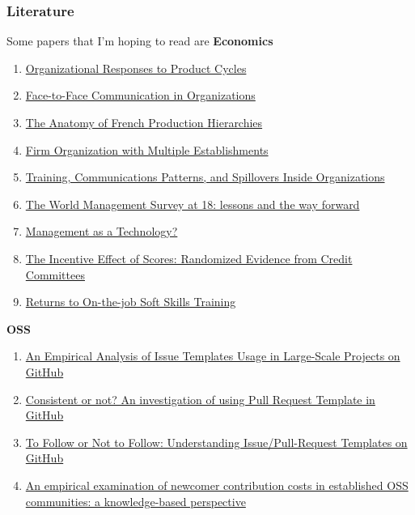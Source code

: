 \documentclass[source/paper/main.tex]{subfiles}
\begin{document}
\subsubsection{Literature} 
Some papers that I'm hoping to read are
\textbf{Economics}
\begin{enumerate}
    \item \hyperlink{https://www.hbs.edu/ris/Publication\%20Files/23-061_d9d37062-d3d7-4377-a959-81f75337916d.pdf}{Organizational Responses to Product Cycles}
    \item \hyperlink{https://academic.oup.com/restud/article-abstract/88/2/574/5922651?redirectedFrom=fulltext}{Face-to-Face Communication in Organizations}
    \item \hyperlink{https://spinup-000d1a-wp-offload-media.s3.amazonaws.com/faculty/wp-content/uploads/sites/40/2019/06/AFPH.pdf}{The Anatomy of French Production Hierarchies}
    \item \hyperlink{https://academic.oup.com/qje/article/137/2/1091/6481649}{Firm Organization with Multiple Establishments}
    \item \hyperlink{https://www.nber.org/papers/w30224}{Training, Communications Patterns, and Spillovers Inside Organizations}
    \item \hyperlink{https://academic.oup.com/oxrep/article-abstract/37/2/231/6311333?redirectedFrom=fulltext}{The World Management Survey at 18: lessons and the way forward}
    \item \hyperlink{https://worldmanagementsurvey.org/wp-content/uploads/2016/07/w22327.pdf}{Management as a Technology?}
    \item \hyperlink{https://drive.google.com/file/d/0B49txSZyKZcFV0lnYTZSa3l0Y1U/view?resourcekey=0-VT4ZQPV2aUJU-_PJ95pPKw}{The Incentive Effect of Scores: Randomized Evidence from Credit Committees}
    \item \hyperlink{https://www.dropbox.com/scl/fi/vvclf3nl45h9ngwimpmyd/PACE_dec2021.pdf?rlkey=pvsydc2bnd2nxyph4aixuzlov&e=1&dl=0}{Returns to On-the-job Soft Skills Training}
\end{enumerate}
\textbf{OSS}
\begin{enumerate}
    \item \hyperlink{https://dl.acm.org/doi/10.1145/3643673}{An Empirical Analysis of Issue Templates Usage in Large-Scale Projects on GitHub}
    \item \hyperlink{https://doi.org/10.1016/j.infsof.2021.106797}{Consistent or not? An investigation of using Pull Request Template in GitHub}
    \item \hyperlink{https://doi.org/10.1109/TSE.2022.3224053}{To Follow or Not to Follow: Understanding Issue/Pull-Request Templates on GitHub}
    \item \hyperlink{source/literature/e2120n2.pdf}{An empirical examination of newcomer contribution costs in established OSS communities: a knowledge-based perspective}
\end{enumerate}
\end{document}
